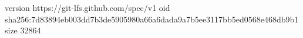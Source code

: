 version https://git-lfs.github.com/spec/v1
oid sha256:7d83894eb003dd7b3de5905980a66a6dada9a7b5ee3117bb5ed0568e468db9b1
size 32864
